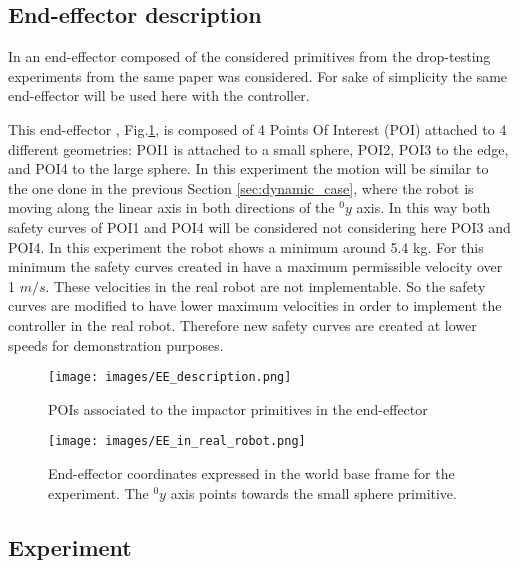 \subsection{End-effector description}
In \cite{sammi_paper} an end-effector composed of the
considered primitives from the drop-testing experiments from the same paper was considered. For sake of simplicity the same end-effector will be used here with the controller.

This end-effector , Fig.\ref{fig:EE_description}, is composed of 4 Points Of Interest (POI) attached to 4 different geometries: POI1 is attached to a small sphere, POI2, POI3 to the edge, and POI4 to the large sphere. 
In this experiment the motion will be similar to the one done in the previous Section \ref{sec:dynamic_case}, where the robot is moving along the linear axis in both directions of the ${}^{0}_{}y$ axis. In this way both safety curves of POI1 and POI4 will be considered not considering here POI3 and POI4.
In this experiment the robot shows a minimum around 5.4 kg. For this minimum the safety curves created in  \cite{sammi_paper} have a maximum permissible velocity over 1 $m/s$. These velocities in the real robot are not implementable. So the safety curves are modified to have lower maximum velocities in order to implement the controller in the real robot. Therefore new safety curves are created at lower speeds for demonstration purposes.





\begin{figure}[htb]
	\centerline{
		\texttt{[image: images/EE\_description.png]}}
	\caption{POIs associated to the impactor primitives in the end-effector \cite{sammi_paper}}
	\label{fig:EE_description}
\end{figure}



\begin{figure}[htb]
	\centerline{
		\texttt{[image: images/EE\_in\_real\_robot.png]}}
	\caption{End-effector coordinates expressed in the world base frame for the experiment. The ${}^{0}_{}y$ axis points towards the small sphere primitive. \cite{sammi_paper}}
	\label{fig:EE_in_real_robot}
\end{figure}





\subsection{Experiment}

